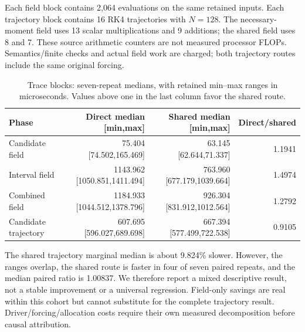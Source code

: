 \documentclass[aps,pra,reprint,onecolumn,10pt,notitlepage,nofootinbib]{revtex4-2}
\begin{document}
Each field block contains 2,064 evaluations on the same retained inputs.
Each trajectory block contains 16 RK4 trajectories with $N=128$.
The necessary-moment field uses 13 scalar multiplications and 9 additions;
the shared field uses 8 and 7. These source arithmetic counters are not
measured processor FLOPs. Semantics/finite checks and actual field work are
charged; both trajectory routes include the same original forcing.

\begin{table}[h]
\caption{Trace blocks: seven-repeat medians, with retained min--max ranges
in microseconds. Values above one in the last column favor the shared route.}
\begin{ruledtabular}
\begin{tabular}{lrrr}
Phase & Direct median [min,max] & Shared median [min,max] & Direct/shared \\
\hline
Candidate field & 75.404 [74.502,165.469] & 63.145 [62.644,71.337] & 1.1941 \\
Interval field & 1143.962 [1050.851,1411.494] & 763.960 [677.179,1039.664] & 1.4974 \\
Combined field & 1184.933 [1044.512,1378.796] & 926.304 [831.912,1012.564] & 1.2792 \\
Candidate trajectory & 607.695 [596.027,689.698] & 667.394 [577.499,722.538] & 0.9105
\end{tabular}
\end{ruledtabular}
\label{tab:trace-time}
\end{table}

The shared trajectory marginal median is about 9.824\% slower. However,
the ranges overlap, the shared route is faster in four of seven paired
repeats, and the median paired ratio is 1.00837. We therefore report a mixed
descriptive result, not a stable improvement or a universal regression.
Field-only savings are real within this cohort but cannot substitute for
the complete trajectory result. Driver/forcing/allocation costs require
their own measured decomposition before causal attribution.
\end{document}
